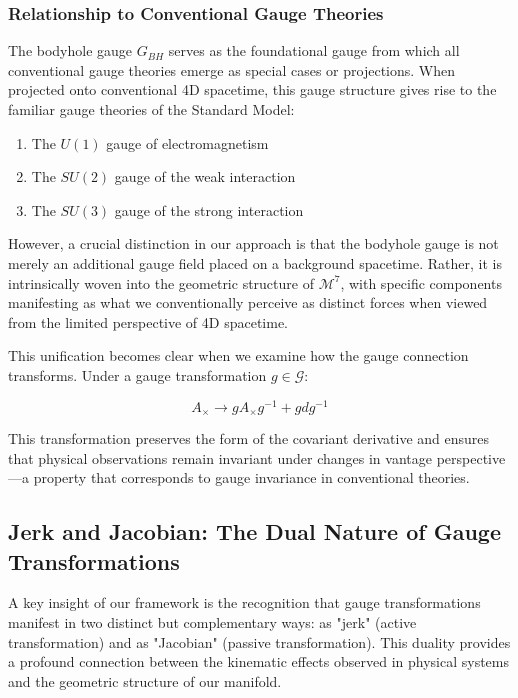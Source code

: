 \documentclass{article}
\begin{document}
\subsubsection{Relationship to Conventional Gauge Theories}

The bodyhole gauge $G_{BH}$ serves as the foundational gauge from which all conventional gauge theories emerge as special cases or projections. When projected onto conventional 4D spacetime, this gauge structure gives rise to the familiar gauge theories of the Standard Model:

\begin{enumerate}
\item The $U(1)$ gauge of electromagnetism
\item The $SU(2)$ gauge of the weak interaction
\item The $SU(3)$ gauge of the strong interaction
\end{enumerate}

However, a crucial distinction in our approach is that the bodyhole gauge is not merely an additional gauge field placed on a background spacetime. Rather, it is intrinsically woven into the geometric structure of $\mathcal{M}^7$, with specific components manifesting as what we conventionally perceive as distinct forces when viewed from the limited perspective of 4D spacetime.

This unification becomes clear when we examine how the gauge connection transforms. Under a gauge transformation $g \in \mathcal{G}$:

\begin{equation}
A_{\times} \rightarrow g A_{\times} g^{-1} + g dg^{-1}
\end{equation}

This transformation preserves the form of the covariant derivative and ensures that physical observations remain invariant under changes in vantage perspective—a property that corresponds to gauge invariance in conventional theories.

\subsection{Jerk and Jacobian: The Dual Nature of Gauge Transformations}

A key insight of our framework is the recognition that gauge transformations manifest in two distinct but complementary ways: as "jerk" (active transformation) and as "Jacobian" (passive transformation). This duality provides a profound connection between the kinematic effects observed in physical systems and the geometric structure of our manifold.
\end{document}
